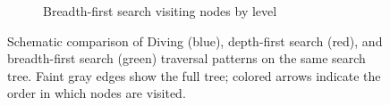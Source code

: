 \begin{figure}[H]
\begin{subfigure}{0.32\textwidth}
        \caption{Breadth-first search visiting nodes by level}
        \label{fig:bfs_path}
    \end{subfigure}

    \caption{Schematic comparison of Diving (blue), depth-first search (red), and breadth-first search (green) traversal patterns on the same search tree. Faint gray edges show the full tree; colored arrows indicate the order in which nodes are visited.}
    \label{fig:diving_dfs_bfs}
\end{figure}